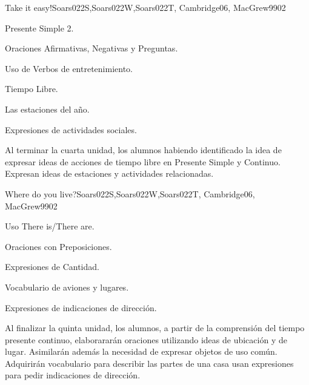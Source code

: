 \begin{syllabus}
\begin{unit}{Take it easy!}{Soars022S,Soars022W,Soars022T, Cambridge06, MacGrew99}{0}{2}
   \begin{topics}
      \item Presente Simple 2.
      \item Oraciones Afirmativas, Negativas y Preguntas.
      \item Uso de Verbos de entretenimiento.
      \item Tiempo Libre.
      \item Las estaciones del año.
      \item Expresiones de actividades sociales.
   \end{topics}

   \begin{unitgoals}
      \item Al terminar la cuarta unidad, los alumnos habiendo identificado la idea de expresar ideas de acciones de tiempo libre en Presente Simple y Continuo. Expresan ideas de estaciones y actividades relacionadas.
   \end{unitgoals}

\end{unit}

\begin{unit}{Where do you live?}{Soars022S,Soars022W,Soars022T, Cambridge06, MacGrew99}{0}{2}
   \begin{topics}
      \item Uso There is/There are.
      \item Oraciones con Preposiciones.
      \item Expresiones de Cantidad.
      \item Vocabulario de aviones y lugares.
      \item Expresiones de indicaciones de dirección.
   \end{topics}

   \begin{unitgoals}
      \item Al finalizar la quinta unidad, los alumnos, a partir de la comprensión del tiempo presente continuo, elaborararán oraciones utilizando ideas de ubicación y de lugar. Asimilarán además la necesidad de expresar objetos de uso común. Adquirirán vocabulario para describir las partes de una casa usan expresiones para pedir indicaciones de dirección.
   \end{unitgoals}

\end{unit}


\end{syllabus}
